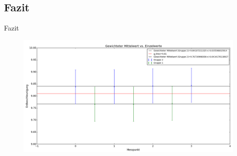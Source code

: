 \documentclass[11pt]{beamer}
\begin{document}
\subsection{Fazit}
\begin{frame}{Fazit}
\begin{center}
\begin{figure}[H]
\includegraphics[scale=0.3]{Bilder/Erdbeschleunigung_alle_bearb.png}
\end{figure}
\end{center}
\end{frame}
\end{document}
